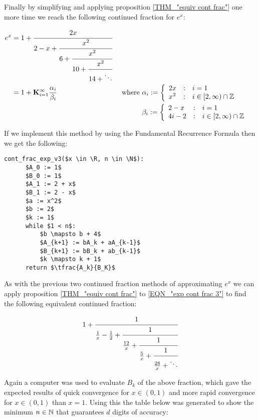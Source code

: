 Finally by simplifying and applying proposition \ref{THM_"equiv cont frac"} one more time we reach the following continued fraction for \(e^x\):

\begin{align}
e^x &= 1 + \cfrac{2x}{2-x+
		   \cfrac{x^2}{6 +
		   \cfrac{x^2}{10+
		   \cfrac{x^2}{14+\ddots} } } } \label{EQN_"exp cont frac 3"}\\
	&= 1 + \mathbf{K}_{i=1}^\infty \frac{\alpha_i}{\beta_i}
		&\textrm{ where }
		&\alpha_i := \left\{\begin{array}{lcl}
			2x &:& i = 1\\
			x^2 &:& i \in [2, \infty)\cap\mathbb{Z}
			\end{array}\right.\nonumber\\
	&&	&\beta_i := \left\{\begin{array}{lcl}
			2 - x &:& i = 1\\
			4i - 2 &:& i \in [2, \infty)\cap \mathbb{Z}
			\end{array}\right.\nonumber
\end{align}

If we implement this method by using the Fundamental Recurrence Formula then we get the following:

\begin{lstlisting}[caption={Continued fraction for \(e^x\) version 3},label={PCD_"cont exp v3"}]
  cont_frac_exp_v3($x \in \R, n \in \N$):
      $A_0 := 1$
      $B_0 := 1$
      $A_1 := 2 + x$
      $B_1 := 2 - x$
      $a := x^2$
      $b := 2$
      $k := 1$
      while $1 < n$:
          $b \mapsto b + 4$
          $A_{k+1} := bA_k + aA_{k-1}$
          $B_{k+1} := bB_k + ab_{k-1}$
          $k \mapsto k + 1$
      return $\tfrac{A_k}{B_K}$
\end{lstlisting}

As with the previous two continued fraction methods of approximating \(e^x\) we can apply proposition \ref{THM_"equiv cont frac"} to \ref{EQN_"exp cont frac 3"} to find the following equivalent continued fraction:

\begin{displaymath}
	1 + \cfrac{1}{\frac{1}{x} - \frac{1}{2} +
		\cfrac{1}{\frac{12}{x} + 
		\cfrac{1}{\frac{5}{x} +
		\cfrac{1}{\frac{28}{x} + \ddots } } } }
\end{displaymath}

Again a computer was used to evaluate \(B_k\) of the above fraction, which gave the expected results of quick convergence for \(x \in (0,1)\) and more rapid convergence for \(x \in (0,1)\) than \(x = 1\). Using this the table below was generated to show the minimum \(n \in \mathbb{N}\) that guarantees \(d\) digits of accuracy:

